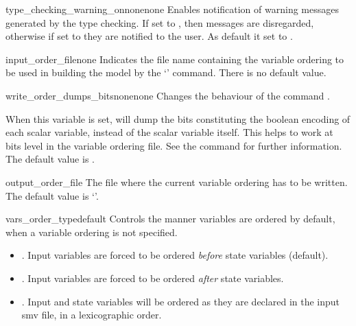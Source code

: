 \begin{nusmvVar}{type\_checking\_warning\_on}{none}{none}
  Enables notification of warning messages generated by the type
  checking. If set to , then messages are disregarded,
  otherwise if set to  they are notified to the user.
%
  As default it set to .
\end{nusmvVar}





\begin{nusmvVar} {input\_order\_file}{}{none}
Indicates the file name containing the variable ordering to be used in
building the model by the `' command. There
is no default value.
\end{nusmvVar}

\begin{nusmvVar} {write\_order\_dumps\_bits}{none}{none}
Changes the behaviour of the command . 

When this variable is set,  will dump the bits
constituting the boolean encoding of each scalar variable, instead of
the scalar variable itself. This helps to work at bits level in the
variable ordering file. See the command  for
further information. The default value is . 
\end{nusmvVar}



\begin{nusmvVar} {output\_order\_file}{}{}
The file where the current variable ordering has to be written. The default value is
`'. 
\end{nusmvVar}

\begin{nusmvVar} {vars\_order\_type}{}{default}
Controls the manner variables are ordered by default, when a variable
ordering is not specified.
\begin{itemize}
\item {}. Input variables are forced to be 
  ordered \emph{before} state variables (default).
\item {}. Input variables are forced to be 
  ordered \emph{after} state variables.
\item {}. Input and state variables will be ordered 
  as they are declared in the input smv file, in a lexicographic order.  
\end{itemize}
\end{nusmvVar}

